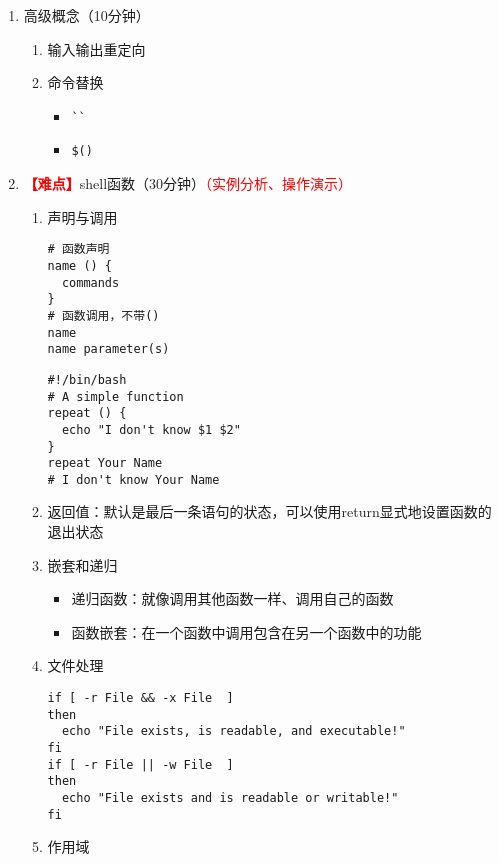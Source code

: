 \documentclass{TIJMUjiaoanLL}
\begin{document}
\begin{enumerate}
  \item 高级概念（10分钟）
    \begin{enumerate}
      \item 输入输出重定向
      \item 命令替换
	\begin{itemize}
	  \item \verb|``|
	  \item \verb|$()|
	\end{itemize}
    \end{enumerate}


\otherTail
\newpage
\otherHeader


  \item
    \textcolor{red}{\textbf{【难点】}}shell函数（30分钟）\textcolor{red}{（实例分析、操作演示）}
    \begin{enumerate}
      \item 声明与调用
	\vspace*{-10pt}
	\begin{multicols}{2}
\begin{verbatim}
# 函数声明
name () {
  commands
}
# 函数调用，不带()
name
name parameter(s)
\end{verbatim}
\begin{verbatim}
#!/bin/bash
# A simple function
repeat () {
  echo "I don't know $1 $2"
}
repeat Your Name
# I don't know Your Name
\end{verbatim}
	\end{multicols}
	\vspace*{-10pt}
      \item 返回值：默认是最后一条语句的状态，可以使用return显式地设置函数的退出状态
      \item 嵌套和递归
	\begin{itemize}
	  \item 递归函数：就像调用其他函数一样、调用自己的函数
	  \item 函数嵌套：在一个函数中调用包含在另一个函数中的功能
	\end{itemize}
      \item 文件处理
	\vspace*{-5pt}
\begin{verbatim}
if [ -r File && -x File  ]
then
  echo "File exists, is readable, and executable!"
fi
if [ -r File || -w File  ]
then
  echo "File exists and is readable or writable!"
fi
\end{verbatim}
	\vspace*{-5pt}
      \item 作用域
	\begin{itemize}

\end{itemize}
\end{enumerate}
\end{enumerate}
\end{document}
